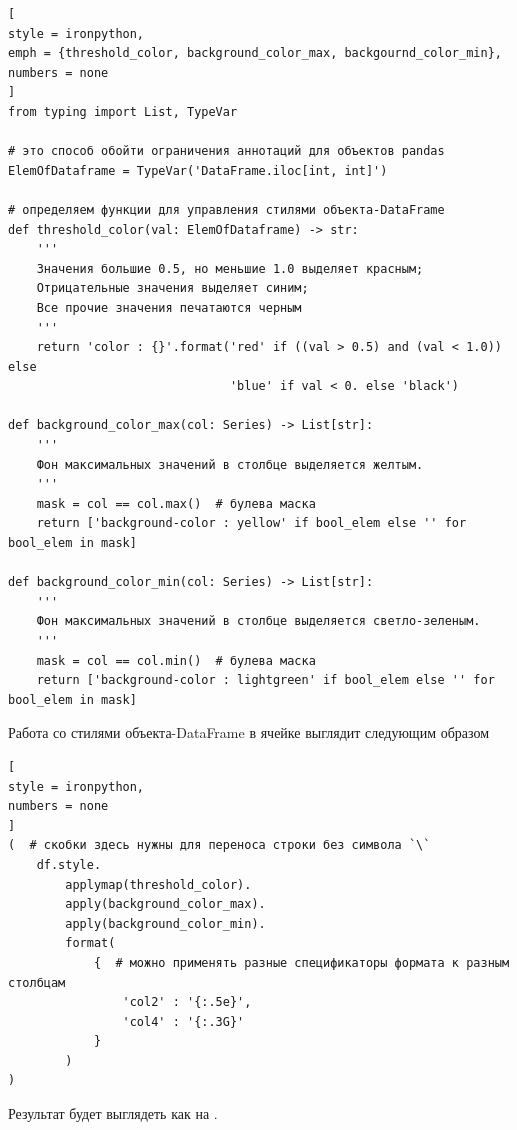 \documentclass[%
	11pt,
	a4paper,
	utf8,
		]{article}
\begin{document}
\begin{lstlisting}[
style = ironpython,
emph = {threshold_color, background_color_max, backgournd_color_min},
numbers = none
]
from typing import List, TypeVar

# это способ обойти ограничения аннотаций для объектов pandas
ElemOfDataframe = TypeVar('DataFrame.iloc[int, int]')

# определяем функции для управления стилями объекта-DataFrame
def threshold_color(val: ElemOfDataframe) -> str:
    '''
    Значения большие 0.5, но меньшие 1.0 выделяет красным;
    Отрицательные значения выделяет синим;
    Все прочие значения печатаются черным
    '''
    return 'color : {}'.format('red' if ((val > 0.5) and (val < 1.0)) else
                               'blue' if val < 0. else 'black')

def background_color_max(col: Series) -> List[str]:
    '''
    Фон максимальных значений в столбце выделяется желтым.
    '''
    mask = col == col.max()  # булева маска
    return ['background-color : yellow' if bool_elem else '' for bool_elem in mask]

def background_color_min(col: Series) -> List[str]:
    '''
    Фон максимальных значений в столбце выделяется светло-зеленым.
    '''
    mask = col == col.min()  # булева маска
    return ['background-color : lightgreen' if bool_elem else '' for bool_elem in mask]
\end{lstlisting}

Работа со стилями объекта-DataFrame в ячейке выглядит следующим образом

\begin{lstlisting}[
style = ironpython,
numbers = none
]
(  # скобки здесь нужны для переноса строки без символа `\`
    df.style.
        applymap(threshold_color).
        apply(background_color_max).
        apply(background_color_min).
        format(
            {  # можно применять разные спецификаторы формата к разным столбцам
                'col2' : '{:.5e}',
                'col4' : '{:.3G}'
            }
        )
)
\end{lstlisting}

Результат будет выглядеть как на .
\end{document}
